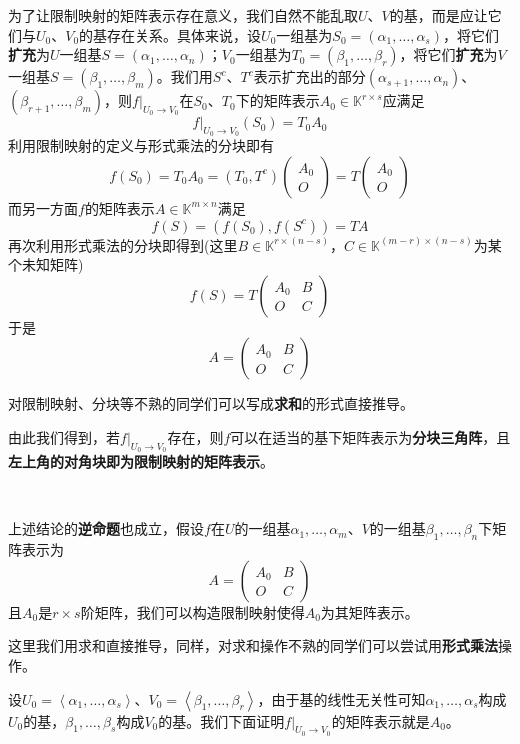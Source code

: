 \documentclass[a4paper,UTF8,fontset=windows,AutoFakeBold]{ctexart}
\newcommand*{\note}{\noindent *}
\begin{document}
为了让限制映射的矩阵表示存在意义，我们自然不能乱取$U$、$V$的基，而是应让它们与$U_0$、$V_0$的基存在关系。具体来说，设$U_0$一组基为$S_0=(\alpha_1,\dots,\alpha_s)$，将它们\textbf{扩充}为$U$一组基$S=(\alpha_1,\dots,\alpha_n)$；$V_0$一组基为$T_0=(\beta_1,\dots,\beta_r)$，将它们\textbf{扩充}为$V$一组基$S=(\beta_1,\dots,\beta_m)$。我们用$S^c$、$T^c$表示扩充出的部分$(\alpha_{s+1},\dots,\alpha_n)$、$(\beta_{r+1},\dots,\beta_m)$，则$f|_{U_0\to V_0}$在$S_0$、$T_0$下的矩阵表示$A_0\in\mathbb{K}^{r\times s}$应满足
$$f|_{U_0\to V_0}(S_0)=T_0A_0$$
利用限制映射的定义与形式乘法的分块即有
$$f(S_0)=T_0A_0=(T_0,T^c)\begin{pmatrix}A_0\\O\end{pmatrix}=T\begin{pmatrix}A_0\\O\end{pmatrix}$$
而另一方面$f$的矩阵表示$A\in\mathbb{K}^{m\times n}$满足
$$f(S)=(f(S_0),f(S^c))=TA$$
再次利用形式乘法的分块即得到(这里$B\in\mathbb{K}^{r\times(n-s)}$，$C\in\mathbb{K}^{(m-r)\times(n-s)}$为某个未知矩阵)
$$f(S)=T\begin{pmatrix}A_0&B\\O&C\end{pmatrix}$$
于是
$$A=\begin{pmatrix}A_0&B\\O&C\end{pmatrix}$$

\note 对限制映射、分块等不熟的同学们可以写成\textbf{求和}的形式直接推导。

由此我们得到，若$f|_{U_0\to V_0}$存在，则$f$可以在适当的基下矩阵表示为\textbf{分块三角阵}，且\textbf{左上角的对角块即为限制映射的矩阵表示}。

\

上述结论的\textbf{逆命题}也成立，假设$f$在$U$的一组基$\alpha_1,\dots,\alpha_m$、$V$的一组基$\beta_1,\dots,\beta_n$下矩阵表示为
$$A=\begin{pmatrix}A_0&B\\O&C\end{pmatrix}$$
且$A_0$是$r\times s$阶矩阵，我们可以构造限制映射使得$A_0$为其矩阵表示。

\note 这里我们用求和直接推导，同样，对求和操作不熟的同学们可以尝试用\textbf{形式乘法}操作。

设$U_0=\left<\alpha_1,\dots,\alpha_s\right>$、$V_0=\left<\beta_1,\dots,\beta_r\right>$，由于基的线性无关性可知$\alpha_1,\dots,\alpha_s$构成$U_0$的基，$\beta_1,\dots,\beta_s$构成$V_0$的基。我们下面证明$f|_{U_0\to V_0}$的矩阵表示就是$A_0$。
\end{document}
